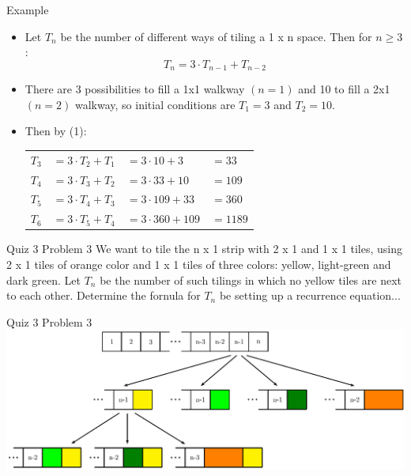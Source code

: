 \documentclass{beamer}
\begin{document}
\begin{frame}{Example}
    \begin{itemize}
        \item Let $T_n$ be the number of different ways of tiling a 1 x n space. Then for $n \geq 3$:
        \begin{equation}\tag{1}
            T_n = 3 \cdot T_{n-1} + T_{n-2}
        \end{equation}
        \item There are 3 possibilities to fill a 1x1 walkway $(n=1)$ and 10 to fill a 2x1 $(n=2)$ walkway, so initial conditions are  $T_1 = 3$ and  $T_2 = 10$.
        \item Then by (1): \\
            \begin{tabular}{l l l l}
                $T_3$ & $=3 \cdot T_{2} + T_{1}$ & $= 3 \cdot 10  + 3$   & $= 33$   \\
                $T_4$ & $=3 \cdot T_{3} + T_{2}$ & $= 3 \cdot 33  + 10$  & $= 109$  \\
                $T_5$ & $=3 \cdot T_{4} + T_{3}$ & $= 3 \cdot 109 + 33$  & $= 360$  \\
                $T_6$ & $=3 \cdot T_{5} + T_{4}$ & $= 3 \cdot 360 + 109$ & $= 1189$ \\
            \end{tabular}   
    \end{itemize}
\end{frame}

\begin{frame}{Quiz 3 Problem 3}
We want to tile the n x 1 strip with 2 x 1 and 1 x 1 tiles, using 2 x 1 tiles of orange color and 1 x 1 tiles of three colors: yellow, light-green and dark green.  Let $T_n$ be the number of such tilings in which no yellow tiles are next to each other.  Determine the fornula for $T_n$ be setting up a recurrence equation...
\end{frame}

\begin{frame}{Quiz 3 Problem 3}
    \centering
    \includegraphics[width=1\linewidth]{tiling2}
\end{frame}
\end{document}
